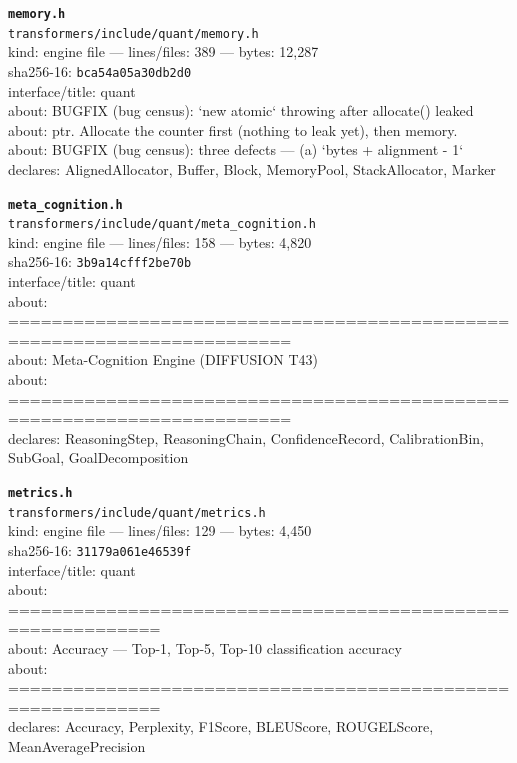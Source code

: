 \noindent\textbf{\texttt{memory.h}}\\
\texttt{transformers/include/quant/memory.h}\\
kind: engine file --- lines/files: 389 --- bytes: 12,287\\
sha256-16: \texttt{bca54a05a30db2d0}\\
interface/title: quant\\
about: BUGFIX (bug census): `new atomic` throwing after allocate() leaked\\
about: ptr. Allocate the counter first (nothing to leak yet), then memory.\\
about: BUGFIX (bug census): three defects — (a) `bytes + alignment - 1`\\
declares: AlignedAllocator, Buffer, Block, MemoryPool, StackAllocator, Marker\\
\vspace*{6.0pt}
\newpage

\noindent\textbf{\texttt{meta\_cognition.h}}\\
\texttt{transformers/include/quant/meta\_cognition.h}\\
kind: engine file --- lines/files: 158 --- bytes: 4,820\\
sha256-16: \texttt{3b9a14cfff2be70b}\\
interface/title: quant\\
about: ========================================================================\\
about: Meta-Cognition Engine (DIFFUSION T43)\\
about: ========================================================================\\
declares: ReasoningStep, ReasoningChain, ConfidenceRecord, CalibrationBin, SubGoal, GoalDecomposition\\
\vspace*{6.0pt}

\noindent\textbf{\texttt{metrics.h}}\\
\texttt{transformers/include/quant/metrics.h}\\
kind: engine file --- lines/files: 129 --- bytes: 4,450\\
sha256-16: \texttt{31179a061e46539f}\\
interface/title: quant\\
about: ============================================================\\
about: Accuracy — Top-1, Top-5, Top-10 classification accuracy\\
about: ============================================================\\
declares: Accuracy, Perplexity, F1Score, BLEUScore, ROUGELScore, MeanAveragePrecision\\
\vspace*{6.0pt}

